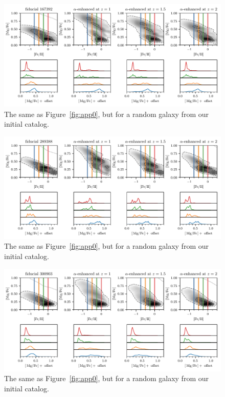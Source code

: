 \begin{appendices}
\begin{figure}
  \centering
  \includegraphics[width=\textwidth]{ch4/app_167392.pdf}
  \caption{The same as Figure~\ref{fig:app0}, but for a random galaxy from our initial catalog.}
  \label{fig:app4}
\end{figure}

\begin{figure}
  \centering
  \includegraphics[width=\textwidth]{ch4/app_289388.pdf}
  \caption{The same as Figure~\ref{fig:app0}, but for a random galaxy from our initial catalog.}
  \label{fig:app5}
\end{figure}

\begin{figure}
  \centering
  \includegraphics[width=\textwidth]{ch4/app_300903.pdf}
  \caption{The same as Figure~\ref{fig:app0}, but for a random galaxy from our initial catalog.}
  \label{fig:app6}
\end{figure}


\end{appendices}
